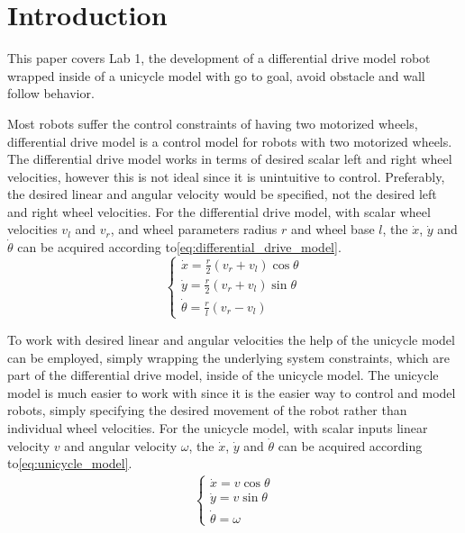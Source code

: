 \section{Introduction}

This paper covers Lab 1, the development of a differential drive model robot wrapped inside of a unicycle model with go to goal, avoid obstacle and wall follow behavior.


Most robots suffer the control constraints of having two motorized wheels, differential drive model is a control model for robots with two motorized wheels. 
The differential drive model works in terms of desired scalar left and right wheel velocities, however this is not ideal since it is unintuitive to control. Preferably, the desired linear and angular velocity would be specified, not the desired left and right wheel velocities.
For the differential drive model, with scalar wheel velocities $v_l$ and $v_r$, and wheel parameters radius $r$ and wheel base $l$, the $\dot{x}$, $\dot{y}$ and $\dot{\theta}$ can be acquired according to\:\eqref{eq:differential_drive_model}\:\cite{carlenerikssonLectureKinematicsBehavioral2024}.
\begin{equation}
    \label{eq:differential_drive_model}
    \begin{cases}
    \dot{x} = \frac{r}{2} (v_r + v_l) \cos{\theta} \\
    \dot{y} = \frac{r}{2} (v_r + v_l) \sin{\theta} \\
    \dot{\theta} = \frac{r}{l} (v_r - v_l)
    \end{cases}
\end{equation}


To work with desired linear and angular velocities the help of the unicycle model can be employed, simply wrapping the underlying system constraints, which are part of the differential drive model, inside of the unicycle model.
The unicycle model is much easier to work with since it is the easier way to control and model robots, simply specifying the desired movement of the robot rather than individual wheel velocities.
For the unicycle model, with scalar inputs linear velocity $v$ and angular velocity $\omega$, the $\dot{x}$, $\dot{y}$ and $\dot{\theta}$ can be acquired according to\:\eqref{eq:unicycle_model}\:\cite{carlenerikssonLectureKinematicsBehavioral2024}.
\begin{align}
    \label{eq:unicycle_model}
    \begin{cases}
    \dot{x} = v \cos{\theta} \\
    \dot{y} = v \sin{\theta} \\
    \dot{\theta} = \omega
    \end{cases}
\end{align}



